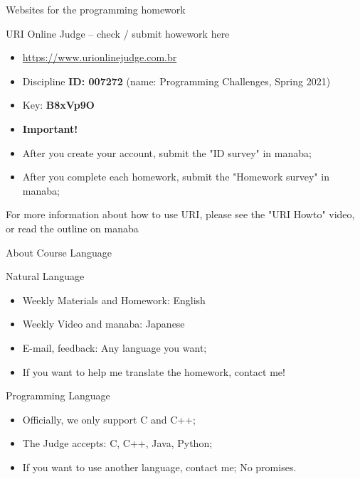 \begin{frame}{Websites for the programming homework}
  \begin{block}{URI Online Judge -- check / submit howework here}
    \begin{itemize}
      \item \url{https://www.urionlinejudge.com.br}
      \item Discipline {\bf ID: 007272} (name: Programming Challenges, Spring 2021)
      \item Key: {\bf B8xVp9O}
      \bigskip

      \item {\bf Important!}
      \item After you create your account, submit the "ID survey" in manaba;
      \item After you complete each homework, submit the "Homework survey" in manaba;
    \end{itemize}
  \end{block}
  For more information about how to use URI, please see the "URI Howto" video, or read the outline on manaba
\end{frame}

\begin{frame}{About Course Language}
  \begin{block}{Natural Language}
    \begin{itemize}
      \item Weekly Materials and Homework: English
      \item Weekly Video and manaba: Japanese
      \item E-mail, feedback: Any language you want;
      \item If you want to help me translate the homework, contact me!
    \end{itemize}
  \end{block}

  \begin{block}{Programming Language}
    \begin{itemize}
      \item Officially, we only support C and C++;
      \item The Judge accepts: C, C++, Java, Python;
      \item If you want to use another language, contact me; No promises.
    \end{itemize}
  \end{block}
\end{frame}

